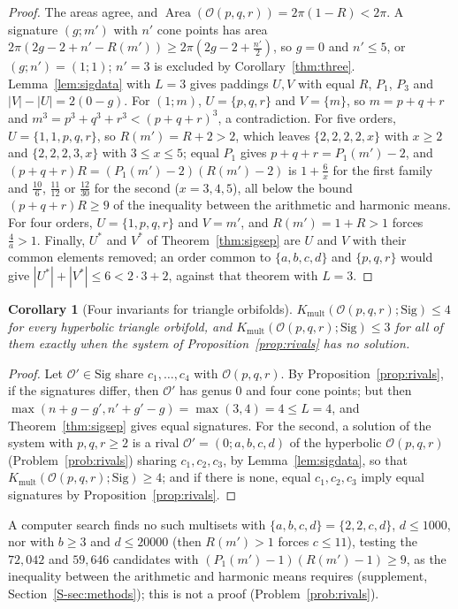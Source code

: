 \documentclass[pdflatex,sn-mathphys-num]{sn-jnl}
\theoremstyle{thmstyleone}%
\newtheorem{corollary}[theorem]{Corollary}%
\theoremstyle{thmstylethree}%
\newcommand{\Orb}{\mathcal{O}}
\newcommand{\Sig}{\mathrm{Sig}}
\newcommand{\Kmult}{K_{\mathrm{mult}}}
\newcommand{\Area}{\operatorname{Area}}
\newcommand{\sref}[1]{\ref*{S-#1}}%
\begin{document}
\begin{proof}
The areas agree, and $\Area(\Orb(p,q,r))=2\pi(1-R)<2\pi$. A signature $(g;m')$ with $n'$ cone points has area $2\pi(2g-2+n'-R(m'))\ge2\pi(2g-2+\frac{n'}2)$, so $g=0$ and $n'\le5$, or $(g;n')=(1;1)$; $n'=3$ is excluded by Corollary~\ref{thm:three}. Lemma~\ref{lem:sigdata} with $L=3$ gives paddings $U,V$ with equal $R$, $P_1$, $P_3$ and $|V|-|U|=2(0-g)$. For $(1;m)$, $U=\{p,q,r\}$ and $V=\{m\}$, so $m=p+q+r$ and $m^3=p^3+q^3+r^3<(p+q+r)^3$, a contradiction. For five orders, $U=\{1,1,p,q,r\}$, so $R(m')=R+2>2$, which leaves $\{2,2,2,2,x\}$ with $x\ge2$ and $\{2,2,2,3,x\}$ with $3\le x\le5$; equal $P_1$ gives $p+q+r=P_1(m')-2$, and $(p+q+r)R=(P_1(m')-2)(R(m')-2)$ is $1+\frac6x$ for the first family and $\frac{10}6$, $\frac{11}{12}$ or $\frac{12}{30}$ for the second ($x=3,4,5$), all below the bound $(p+q+r)R\ge9$ of the inequality between the arithmetic and harmonic means. For four orders, $U=\{1,p,q,r\}$ and $V=m'$, and $R(m')=1+R>1$ forces $\frac4a>1$. Finally, $U^*$ and $V^*$ of Theorem~\ref{thm:sigsep} are $U$ and $V$ with their common elements removed; an order common to $\{a,b,c,d\}$ and $\{p,q,r\}$ would give $|U^*|+|V^*|\le6<2\cdot3+2$, against that theorem with $L=3$.
\end{proof}

\begin{corollary}[Four invariants for triangle orbifolds]\label{cor:tri4}
$\Kmult(\Orb(p,q,r);\Sig)\le4$ for every hyperbolic triangle orbifold, and $\Kmult(\Orb(p,q,r);\Sig)\le3$ for all of them exactly when the system of Proposition~\ref{prop:rivals} has no solution.
\end{corollary}

\begin{proof}
Let $\Orb'\in\Sig$ share $c_1,\dots,c_4$ with $\Orb(p,q,r)$. By Proposition~\ref{prop:rivals}, if the signatures differ, then $\Orb'$ has genus $0$ and four cone points; but then $\max(n+g-g',n'+g'-g)=\max(3,4)=4\le L=4$, and Theorem~\ref{thm:sigsep} gives equal signatures. For the second, a solution of the system with $p,q,r\ge2$ is a rival $\Orb'=(0;a,b,c,d)$ of the hyperbolic $\Orb(p,q,r)$ (Problem~\ref{prob:rivals}) sharing $c_1,c_2,c_3$, by Lemma~\ref{lem:sigdata}, so that $\Kmult(\Orb(p,q,r);\Sig)\ge4$; and if there is none, equal $c_1,c_2,c_3$ imply equal signatures by Proposition~\ref{prop:rivals}.
\end{proof}

A computer search finds no such multisets with $\{a,b,c,d\}=\{2,2,c,d\}$, $d\le1000$, nor with $b\ge3$ and $d\le20000$ (then $R(m')>1$ forces $c\le11$), testing the $72{,}042$ and $59{,}646$ candidates with $(P_1(m')-1)(R(m')-1)\ge9$, as the inequality between the arithmetic and harmonic means requires (supplement, Section~\sref{sec:methods}); this is not a proof (Problem~\ref{prob:rivals}).
\end{document}
